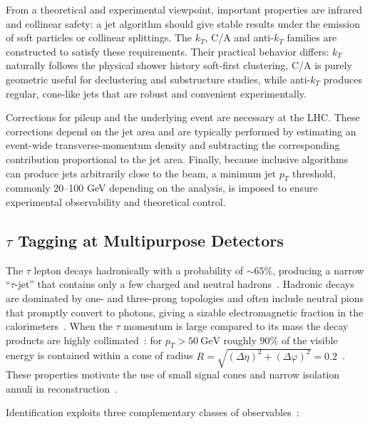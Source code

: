 From a theoretical and experimental viewpoint, important properties are infrared and collinear safety: a jet algorithm should give stable results under the emission of soft particles or collinear splittings. The $k_T$, C/A and anti-$k_T$ families are constructed to satisfy these requirements. Their practical behavior differs: $k_T$ naturally follows the physical shower history soft-first clustering, C/A is purely geometric useful for declustering and substructure studies, while anti-$k_T$ produces regular, cone-like jets that are robust and convenient experimentally.

Corrections for pileup and the underlying event are necessary at the LHC. These corrections depend on the jet area and are typically performed by estimating an event-wide transverse-momentum density and subtracting the corresponding contribution proportional to the jet area. Finally, because inclusive algorithms can produce jets arbitrarily close to the beam, a minimum jet $p_T$ threshold, commonly 20–100 GeV depending on the analysis, is imposed to ensure experimental observability and theoretical control.

\subsection{$\tau$ Tagging at Multipurpose Detectors}

The $\tau$ lepton decays hadronically with a probability of $\sim65\%$, producing a narrow ``$\tau$-jet'' that contains only a few charged and neutral hadrons~\cite{dummy}. Hadronic decays are dominated by one- and three-prong topologies and often include neutral pions that promptly convert to photons, giving a sizable electromagnetic fraction in the calorimeters~\cite{dummy}. When the $\tau$ momentum is large compared to its mass the decay products are highly collimated~\cite{dummy}: for $p_T>50\ \mathrm{GeV}$ roughly $90\%$ of the visible energy is contained within a cone of radius $R=\sqrt{(\Delta\eta)^2+(\Delta\varphi)^2}=0.2$~\cite{dummy}. These properties motivate the use of small signal cones and narrow isolation annuli in reconstruction~\cite{dummy}.

Identification exploits three complementary classes of observables~\cite{dummy}:

